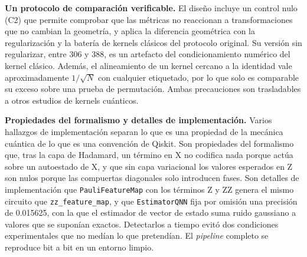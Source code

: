 \textbf{Un protocolo de comparación verificable.} El diseño incluye un control nulo (C2) que permite
comprobar que las métricas no reaccionan a transformaciones que no cambian la geometría, y aplica la
diferencia geométrica con la regularización y la batería de kernels clásicos del protocolo original. Su
versión sin regularizar, entre 306 y 388, es un artefacto del condicionamiento numérico del kernel
clásico. Además, el alineamiento de un kernel cercano a la identidad vale aproximadamente $1/\sqrt{N}$
con cualquier etiquetado, por lo que solo es comparable su exceso sobre una prueba de permutación.
Ambas precauciones son trasladables a otros estudios de kernels cuánticos.

\textbf{Propiedades del formalismo y detalles de implementación.} Varios hallazgos de implementación
separan lo que es una propiedad de la mecánica cuántica de lo que es una convención de Qiskit. Son
propiedades del formalismo que, tras la capa de Hadamard, un término en X no codifica nada porque actúa
sobre un autoestado de X, y que sin capa variacional los valores esperados en Z son nulos porque las
compuertas diagonales solo introducen fases. Son detalles de implementación que \texttt{PauliFeatureMap}
con los términos Z y ZZ genera el mismo circuito que \texttt{zz\_feature\_map}, y que
\texttt{EstimatorQNN} fija por omisión una precisión de 0.015625, con la que el estimador de vector de
estado suma ruido gaussiano a valores que se suponían exactos. Detectarlos a
tiempo evitó dos condiciones experimentales que no medían lo que pretendían. El \textit{pipeline}
completo se reproduce bit a bit en un entorno limpio.
